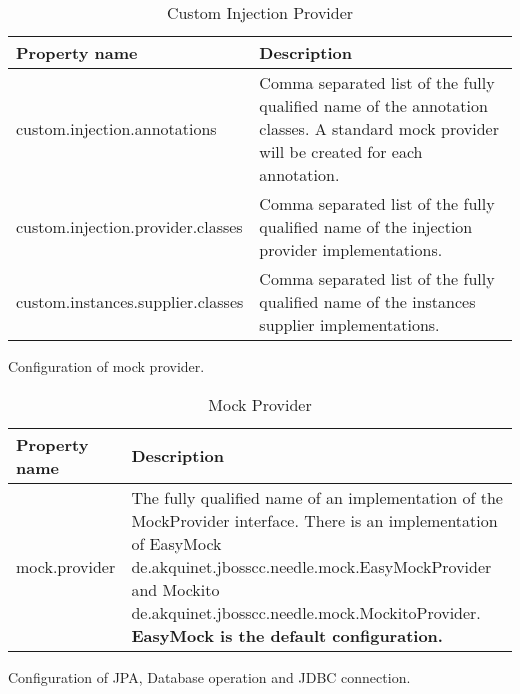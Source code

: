 \begin{table}[H]
\centering
\begin{tabular}{p{6cm}p{11cm}} \toprule
    \textbf{Property name} & \textbf{Description} \\ \midrule
    custom.injection.annotations & Comma separated list of the fully qualified name of the annotation classes. A standard mock provider will be created for each annotation. \\
    custom.injection.provider.classes & Comma separated list of the fully qualified name of the injection provider implementations. \\
    custom.instances.supplier.classes & Comma separated list of the fully qualified name of the instances supplier implementations.\\
\bottomrule
\end{tabular}
\caption{Custom Injection Provider}
\end{table}

\parskip 14pt
\parindent 0pt
Configuration of mock provider.

\begin{table}[H]
\centering
\begin{tabular}{p{6cm}p{11cm}} \toprule
    \textbf{Property name} & \textbf{Description} \\ \midrule
    mock.provider & The fully qualified name of an implementation of the MockProvider interface. There is an implementation of EasyMock de.akquinet.jbosscc.needle.mock.EasyMockProvider and Mockito de.akquinet.jbosscc.needle.mock.MockitoProvider. \textbf{EasyMock is the default configuration.}  \\
\bottomrule
\end{tabular}
\caption{Mock Provider}
\end{table}


\parskip 14pt
\parindent 0pt
Configuration of JPA, Database operation and JDBC connection.

